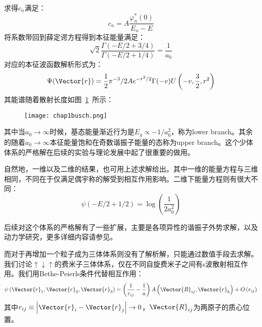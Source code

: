 求得$c_n$满足：
\begin{equation}
c_{n}=A \frac{\varphi_{n}^{*}(0)}{E_{n}-E}
\end{equation}
将系数带回到薛定谔方程得到本征能量满足：
\begin{equation}
\sqrt{2} \frac{\Gamma(-E / 2+3 / 4)}{\Gamma(-E / 2+1 / 4)}=\frac{1}{a_{0}}
\end{equation}
对应的本征波函数解析形式为：
\begin{equation}
\Psi(\Vector{r})=\frac{1}{2} \pi^{-3} / 2 A e^{-r^{2} / 2} \Gamma(-v) U\left(-v, \frac{3}{2}, r^{2}\right)
\end{equation}
其能谱随着散射长度如图~\ref{chap1busch}~所示：
\begin{figure}[!htbp]
    \centering
    \texttt{[image: chap1busch.png]}
    \label{chap1busch}
\end{figure}
其中当$a_0\to \infty$时候，基态能量渐近行为是$E_g\propto - 1/a_0^2$，称为lower branch。其余的随着$a_0\to\infty$本征能量饱和在奇数谐振子能量的态称为upper branch。这个少体体系的严格解在后续的实验与理论发展中起了很重要的做用。

自然地，一维以及二维的结果，也可用上述求解给出。其中一维的能量方程与三维相同，不同在于仅满足偶宇称的解受到相互作用影响。二维下能量方程则有很大不同：
\begin{equation}
\psi(-E / 2+1 / 2)=\log \left(\frac{1}{2 a_{0}^{2}}\right)
\end{equation}

后续对这个体系的严格解有了一些扩展，主要是各项异性的谐振子外势求解，以及动力学研究，更多详细内容请参见\cite{blume2012few}。


而对于再增加一个粒子成为三体体系则没有了解析解，只能通过数值手段去求解。我们讨论$\uparrow\downarrow\uparrow$的费米子三体体系，仅在不同自旋费米子之间有s波散射相互作用\cite{OlshaniiRigorous2001,Petrov2003unitary3b,Fleix2006prlunitary3b,Felix2006praunitary3b,LmDuan2007levelcrossing,Stetcu2007,Blume2008,Blume2010,Xiaji2009prl,Xiaji20103b,Rittenhouse2010green}。我们用Bethe-Peierls条件代替相互作用：
\begin{equation}
\psi\left(\Vector{r}_{1}, \Vector{r}_{2}, \Vector{r}_{3}\right)=\left(\frac{1}{r_{i j}}-\frac{1}{a}\right) A\left(\Vector{R}_{i j}, \Vector{r}_{k}\right)+O\left(r_{i j}\right)
\end{equation}
其中$r_{i j} \equiv\left|\Vector{r}_{i}-\Vector{r}_{j}\right| \rightarrow 0$，$\Vector{R}_{ij}$为两原子的质心位置。

